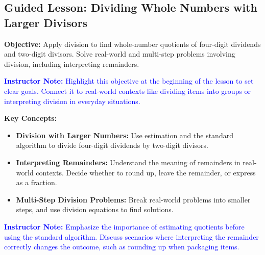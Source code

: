 \documentclass[12pt]{article}
\title{}
\date{}
\begin{document}
\subsection*{Guided Lesson: Dividing Whole Numbers with Larger Divisors}
\onehalfspacing

\begin{tcolorbox}[colframe=black!40, colback=gray!5, 
coltitle=black, colbacktitle=black!20, fonttitle=\bfseries\Large, 
title=Learning Objective, halign title=center, left=5pt, right=5pt, top=5pt, bottom=15pt]
\textbf{Objective:} Apply division to find whole-number quotients of four-digit dividends and two-digit divisors. Solve real-world and multi-step problems involving division, including interpreting remainders.

\textcolor{blue}{\textbf{Instructor Note:} Highlight this objective at the beginning of the lesson to set clear goals. Connect it to real-world contexts like dividing items into groups or interpreting division in everyday situations.}
\end{tcolorbox}

\vspace{1em}

\begin{tcolorbox}[colframe=black!60, colback=white, 
coltitle=black, colbacktitle=black!15, fonttitle=\bfseries\Large, 
title=Key Concepts and Vocabulary, halign title=center, left=10pt, right=10pt, top=10pt, bottom=15pt]
\textbf{Key Concepts:}
\begin{itemize}
    \item \textbf{Division with Larger Numbers:} Use estimation and the standard algorithm to divide four-digit dividends by two-digit divisors.
    \item \textbf{Interpreting Remainders:} Understand the meaning of remainders in real-world contexts. Decide whether to round up, leave the remainder, or express as a fraction.
    \item \textbf{Multi-Step Division Problems:} Break real-world problems into smaller steps, and use division equations to find solutions.
\end{itemize}

\textcolor{blue}{\textbf{Instructor Note:} Emphasize the importance of estimating quotients before using the standard algorithm. Discuss scenarios where interpreting the remainder correctly changes the outcome, such as rounding up when packaging items.}
\end{tcolorbox}
\end{document}
